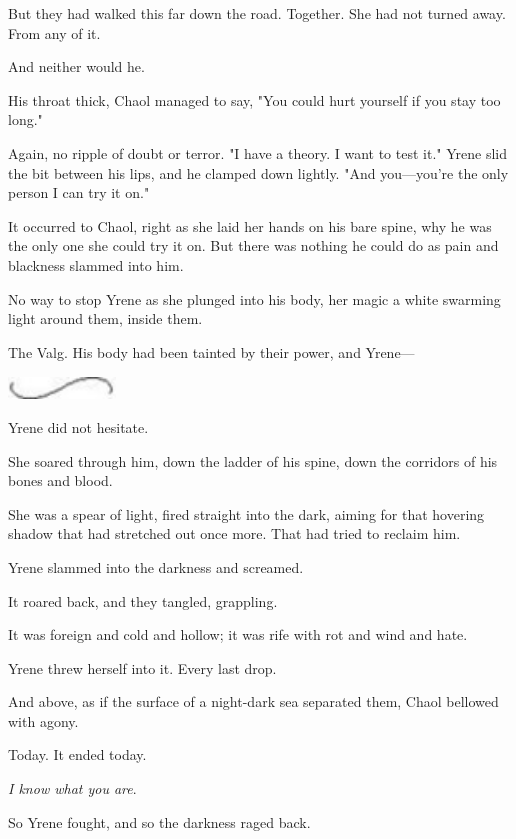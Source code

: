 But they had walked this far down the road. Together. She had not turned away. From any of it.

And neither would he.

His throat thick, Chaol managed to say, "You could hurt yourself if you stay too long."

Again, no ripple of doubt or terror. "I have a theory. I want to test it." Yrene slid the bit between his lips, and he clamped down lightly. "And you---you're the only person I can try it on."

It occurred to Chaol, right as she laid her hands on his bare spine, why he was the only one she could try it on. But there was nothing he could do as pain and blackness slammed into him.

No way to stop Yrene as she plunged into his body, her magic a white swarming light around them, inside them.

The Valg. His body had been tainted by their power, and Yrene---

\includegraphics[width=1.12in,height=0.24in]{images/seperator}

Yrene did not hesitate.

She soared through him, down the ladder of his spine, down the corridors of his bones and blood.

She was a spear of light, fired straight into the dark, aiming for that hovering shadow that had stretched out once more. That had tried to reclaim him.

Yrene slammed into the darkness and screamed.

It roared back, and they tangled, grappling.

It was foreign and cold and hollow; it was rife with rot and wind and hate.

Yrene threw herself into it. Every last drop.

And above, as if the surface of a night-dark sea separated them, Chaol bellowed with agony.

Today. It ended today.

\emph{I know what you are}.

So Yrene fought, and so the darkness raged back.

